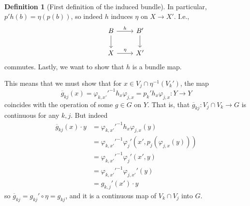 \documentclass[reqno]{amsart}
\theoremstyle{definition}
\newtheorem{definition}[theorem]{Definition}
\theoremstyle{remark}
\begin{document}
\begin{definition}[First definition of the induced bundle]
        In particular,
        $p' h(b) = \eta(p(b))$, so
        indeed $h$ induces $\eta$ on $X \to X'$. I.e.,
        \begin{equation*}
        \begin{tikzcd}
            B \ar[r, "h"] \ar[d] & B'\ar[d] \\
            X \ar[r, "\eta"] & X'
        \end{tikzcd}
        \end{equation*}
        commutes.
        Lastly, we want to show that $h$ is a bundle map.

        This means that we must show that
        for
        $x \in V_j \cap \eta^{-1}(V_k')$, the map
        \[
        \overline{g}_{kj}(x) =
        \varphi_{k,x'}'^{-1} h_x \varphi_{j,x} = 
        p_k' h_x \varphi_{j,x} \colon Y \to Y
        \] 
        coincides with the operation of some $g \in G$
        on $Y$. That is, that 
        $\overline{g}_{kj} \colon
        V_{j} \cap V_{k} \to G$ is continuous for any
        $k,j$.
        But indeed
        \begin{align*}
            \overline{g}_{kj}(x)\cdot y
            &= \varphi_{k,x'}'^{-1} h_x \varphi_{j,x}(y)\\
            &= 
            \varphi_{k,x'}'^{-1} 
            \varphi_j' \left( x',
            p_j \left( \varphi_{j,x}(y) \right)  \right) \\
            &= \varphi_{k,x'}'^{-1} 
            \varphi_{j}' \left( x', y \right) \\
            &= \varphi_{k,x'}'^{-1} \varphi_{j,x'}'(y)\\
            &= g_{k,j}' (x') \cdot y
        \end{align*}
        so $\overline{g}_{kj} =
        g_{kj}' \circ \eta = g_{kj}$, and it is
        a continuous map of
        $V_{k} \cap V_j $ into $G$.
        
    \end{definition}
\end{document}
